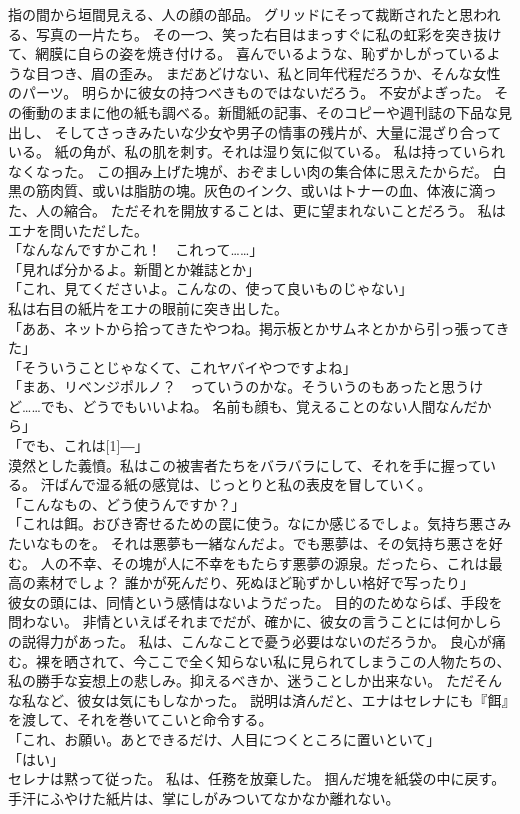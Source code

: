 \documentclass[../IHMain]{subfiles}
\begin{document}
指の間から垣間見える、人の顔の部品。
グリッドにそって裁断されたと思われる、写真の一片たち。
その一つ、笑った右目はまっすぐに私の虹彩を突き抜けて、網膜に自らの姿を焼き付ける。
喜んでいるような、恥ずかしがっているような目つき、眉の歪み。
まだあどけない、私と同年代程だろうか、そんな女性のパーツ。
明らかに彼女の持つべきものではないだろう。
不安がよぎった。
その衝動のままに他の紙も調べる。新聞紙の記事、そのコピーや週刊誌の下品な見出し、
そしてさっきみたいな少女や男子の情事の残片が、大量に混ざり合っている。
紙の角が、私の肌を刺す。それは湿り気に似ている。
私は持っていられなくなった。
この掴み上げた塊が、おぞましい肉の集合体に思えたからだ。
白黒の筋肉質、或いは脂肪の塊。灰色のインク、或いはトナーの血、体液に滴った、人の縮合。
ただそれを開放することは、更に望まれないことだろう。
私はエナを問いただした。\\
「なんなんですかこれ！　これって……」\\
「見れば分かるよ。新聞とか雑誌とか」\\
「これ、見てくださいよ。こんなの、使って良いものじゃない」\\
私は右目の紙片をエナの眼前に突き出した。\\
「ああ、ネットから拾ってきたやつね。掲示板とかサムネとかから引っ張ってきた」\\
「そういうことじゃなくて、これヤバイやつですよね」\\
「まあ、リベンジポルノ？　っていうのかな。そういうのもあったと思うけど……でも、どうでもいいよね。
名前も顔も、覚えることのない人間なんだから」\\
「でも、これは\scalebox{3}[1]{―}」\\
漠然とした義憤。私はこの被害者たちをバラバラにして、それを手に握っている。
汗ばんで湿る紙の感覚は、じっとりと私の表皮を冒していく。\\
「こんなもの、どう使うんですか？」\\
「これは餌。おびき寄せるための罠に使う。なにか感じるでしょ。気持ち悪さみたいなものを。
それは悪夢も一緒なんだよ。でも悪夢は、その気持ち悪さを好む。
人の不幸、その塊が人に不幸をもたらす悪夢の源泉。だったら、これは最高の素材でしょ？
誰かが死んだり、死ぬほど恥ずかしい格好で写ったり」\\
彼女の頭には、同情という感情はないようだった。
目的のためならば、手段を問わない。
非情といえばそれまでだが、確かに、彼女の言うことには何かしらの説得力があった。
私は、こんなことで憂う必要はないのだろうか。
良心が痛む。裸を晒されて、今ここで全く知らない私に見られてしまうこの人物たちの、
私の勝手な妄想上の悲しみ。抑えるべきか、迷うことしか出来ない。
ただそんな私など、彼女は気にもしなかった。
説明は済んだと、エナはセレナにも『餌』を渡して、それを巻いてこいと命令する。\\
「これ、お願い。あとできるだけ、人目につくところに置いといて」\\
「はい」\\
セレナは黙って従った。
私は、任務を放棄した。
掴んだ塊を紙袋の中に戻す。手汗にふやけた紙片は、掌にしがみついてなかなか離れない。
\end{document}
